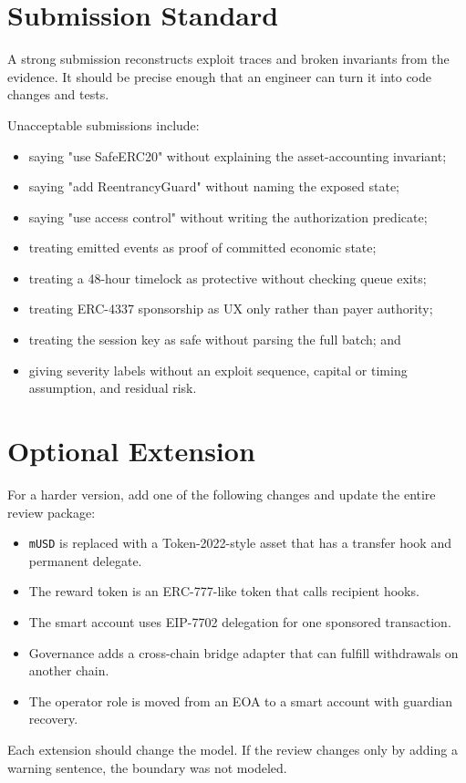 \section*{Submission Standard}

A strong submission reconstructs exploit traces and broken invariants from the evidence. It should be precise enough that an engineer can turn it into code changes and tests.

Unacceptable submissions include:

\begin{itemize}
\item saying "use SafeERC20" without explaining the asset-accounting invariant;
\item saying "add ReentrancyGuard" without naming the exposed state;
\item saying "use access control" without writing the authorization predicate;
\item treating emitted events as proof of committed economic state;
\item treating a 48-hour timelock as protective without checking queue exits;
\item treating ERC-4337 sponsorship as UX only rather than payer authority;
\item treating the session key as safe without parsing the full batch; and
\item giving severity labels without an exploit sequence, capital or timing assumption, and residual risk.
\end{itemize}

\section*{Optional Extension}

For a harder version, add one of the following changes and update the entire review package:

\begin{itemize}
\item \texttt{mUSD} is replaced with a Token-2022-style asset that has a transfer hook and permanent delegate.
\item The reward token is an ERC-777-like token that calls recipient hooks.
\item The smart account uses EIP-7702 delegation for one sponsored transaction.
\item Governance adds a cross-chain bridge adapter that can fulfill withdrawals on another chain.
\item The operator role is moved from an EOA to a smart account with guardian recovery.
\end{itemize}

Each extension should change the model. If the review changes only by adding a warning sentence, the boundary was not modeled.
